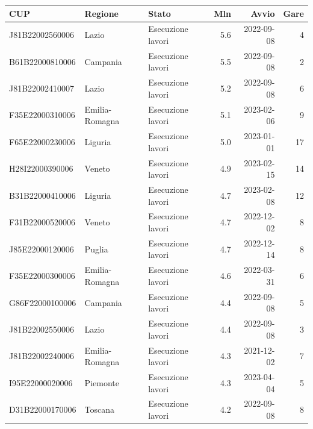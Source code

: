 \begin{tabular}{lllrrr}
\toprule
CUP & Regione & Stato & Mln \texteuro{} & Avvio & Gare \\
\midrule
J81B22002560006 & Lazio & Esecuzione lavori & 5.6 & 2022-09-08 & 4 \\
B61B22000810006 & Campania & Esecuzione lavori & 5.5 & 2022-09-08 & 2 \\
J81B22002410007 & Lazio & Esecuzione lavori & 5.2 & 2022-09-08 & 6 \\
F35E22000310006 & Emilia-Romagna & Esecuzione lavori & 5.1 & 2023-02-06 & 9 \\
F65E22000230006 & Liguria & Esecuzione lavori & 5.0 & 2023-01-01 & 17 \\
H28I22000390006 & Veneto & Esecuzione lavori & 4.9 & 2023-02-15 & 14 \\
B31B22000410006 & Liguria & Esecuzione lavori & 4.7 & 2023-02-08 & 12 \\
F31B22000520006 & Veneto & Esecuzione lavori & 4.7 & 2022-12-02 & 8 \\
J85E22000120006 & Puglia & Esecuzione lavori & 4.7 & 2022-12-14 & 8 \\
F35E22000300006 & Emilia-Romagna & Esecuzione lavori & 4.6 & 2022-03-31 & 6 \\
G86F22000100006 & Campania & Esecuzione lavori & 4.4 & 2022-09-08 & 5 \\
J81B22002550006 & Lazio & Esecuzione lavori & 4.4 & 2022-09-08 & 3 \\
J81B22002240006 & Emilia-Romagna & Esecuzione lavori & 4.3 & 2021-12-02 & 7 \\
I95E22000020006 & Piemonte & Esecuzione lavori & 4.3 & 2023-04-04 & 5 \\
D31B22000170006 & Toscana & Esecuzione lavori & 4.2 & 2022-09-08 & 8 \\
\bottomrule
\end{tabular}

